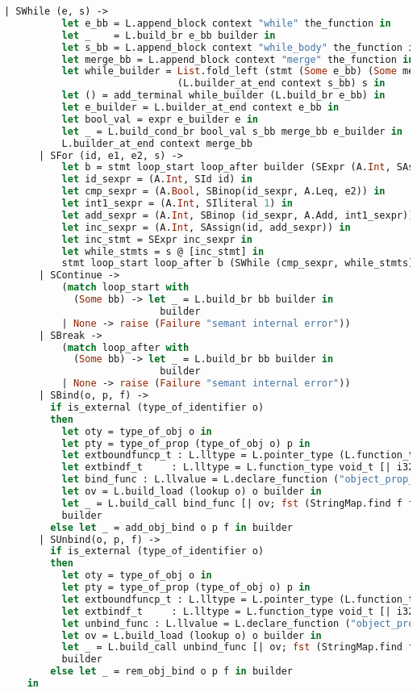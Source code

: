 \begin{lstlisting}[language=Caml,backgroundcolor=\color{backgroundcolor}]
      | SWhile (e, s) ->
          let e_bb = L.append_block context "while" the_function in
          let _    = L.build_br e_bb builder in
          let s_bb = L.append_block context "while_body" the_function in
          let merge_bb = L.append_block context "merge" the_function in
          let while_builder = List.fold_left (stmt (Some e_bb) (Some merge_bb))
                              (L.builder_at_end context s_bb) s in
          let () = add_terminal while_builder (L.build_br e_bb) in
          let e_builder = L.builder_at_end context e_bb in
          let bool_val = expr e_builder e in
          let _ = L.build_cond_br bool_val s_bb merge_bb e_builder in
          L.builder_at_end context merge_bb
      | SFor (id, e1, e2, s) ->
          let b = stmt loop_start loop_after builder (SExpr (A.Int, SAssign(id, e1))) in
          let id_sexpr = (A.Int, SId id) in
          let cmp_sexpr = (A.Bool, SBinop(id_sexpr, A.Leq, e2)) in
          let int1_sexpr = (A.Int, SIliteral 1) in
          let add_sexpr = (A.Int, SBinop (id_sexpr, A.Add, int1_sexpr)) in
          let inc_sexpr = (A.Int, SAssign(id, add_sexpr)) in
          let inc_stmt = SExpr inc_sexpr in
          let while_stmts = s @ [inc_stmt] in
          stmt loop_start loop_after b (SWhile (cmp_sexpr, while_stmts))
      | SContinue ->
          (match loop_start with
            (Some bb) -> let _ = L.build_br bb builder in
                           builder
          | None -> raise (Failure "semant internal error"))
      | SBreak ->
          (match loop_after with
            (Some bb) -> let _ = L.build_br bb builder in
                           builder
          | None -> raise (Failure "semant internal error"))
      | SBind(o, p, f) ->
        if is_external (type_of_identifier o)
        then
          let oty = type_of_obj o in
          let pty = type_of_prop (type_of_obj o) p in
          let extboundfuncp_t : L.lltype = L.pointer_type (L.function_type void_t [| ltype_of_typ pty; ltype_of_typ pty |]) in
          let extbindf_t     : L.lltype = L.function_type void_t [| i32_t; extboundfuncp_t |] in
          let bind_func : L.llvalue = L.declare_function ("object_prop_bind_" ^ oty ^ "_" ^ p) extbindf_t the_module in
          let ov = L.build_load (lookup o) o builder in
          let _ = L.build_call bind_func [| ov; fst (StringMap.find f function_decls) |] "" builder in
          builder
        else let _ = add_obj_bind o p f in builder
      | SUnbind(o, p, f) ->
        if is_external (type_of_identifier o)
        then
          let oty = type_of_obj o in
          let pty = type_of_prop (type_of_obj o) p in
          let extboundfuncp_t : L.lltype = L.pointer_type (L.function_type void_t [| ltype_of_typ pty; ltype_of_typ pty |]) in
          let extbindf_t     : L.lltype = L.function_type void_t [| i32_t; extboundfuncp_t |] in
          let unbind_func : L.llvalue = L.declare_function ("object_prop_unbind_" ^ oty ^ "_" ^ p) extbindf_t the_module in
          let ov = L.build_load (lookup o) o builder in
          let _ = L.build_call unbind_func [| ov; fst (StringMap.find f function_decls) |] "" builder in
          builder
        else let _ = rem_obj_bind o p f in builder
    in


\end{lstlisting}

